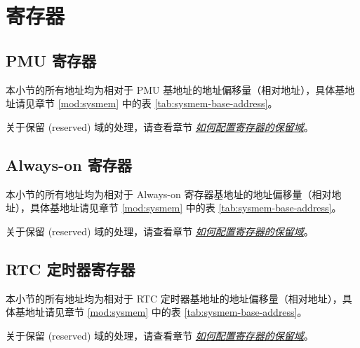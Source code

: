 \documentclass[main\_\_CN.tex]{subfiles}
\begin{document}
\section{寄存器}

\subsection{PMU 寄存器}

本小节的所有地址均为相对于 PMU 基地址的地址偏移量（相对地址），具体基地址请见章节 \ref{mod:sysmem} \textit{} 中的表 \ref{tab:sysmem-base-address}。

关于保留 (reserved) 域的处理，请查看章节 \hyperref[programming-reserved-field]{\textit{如何配置寄存器的保留域}}。



\subsection{Always-on 寄存器}

本小节的所有地址均为相对于 Always-on 寄存器基地址的地址偏移量（相对地址），具体基地址请见章节 \ref{mod:sysmem} \textit{} 中的表 \ref{tab:sysmem-base-address}。

关于保留 (reserved) 域的处理，请查看章节 \hyperref[programming-reserved-field]{\textit{如何配置寄存器的保留域}}。



\subsection{RTC 定时器寄存器}

本小节的所有地址均为相对于 RTC 定时器基地址的地址偏移量（相对地址），具体基地址请见章节 \ref{mod:sysmem} \textit{} 中的表 \ref{tab:sysmem-base-address}。

关于保留 (reserved) 域的处理，请查看章节 \hyperref[programming-reserved-field]{\textit{如何配置寄存器的保留域}}。


\end{document}
